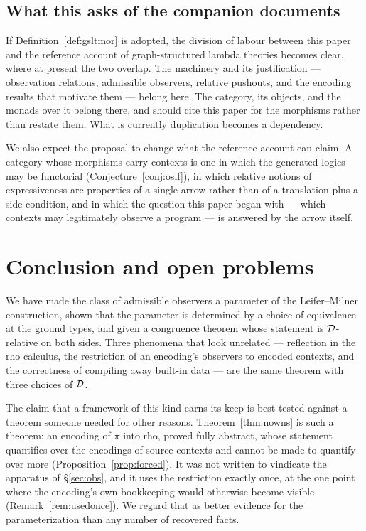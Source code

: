 \documentclass{article}
\begin{document}
\subsection{What this asks of the companion documents}

If Definition~\ref{def:gsltmor} is adopted, the division of labour between this paper and the reference account of graph-structured lambda theories becomes clear, where at present the two overlap. The machinery and its justification --- observation relations, admissible observers, relative pushouts, and the encoding results that motivate them --- belong here. The category, its objects, and the monads over it belong there, and should cite this paper for the morphisms rather than restate them. What is currently duplication becomes a dependency.

We also expect the proposal to change what the reference account can claim. A category whose morphisms carry contexts is one in which the generated logics may be functorial (Conjecture~\ref{conj:oslf}), in which relative notions of expressiveness are properties of a single arrow rather than of a translation plus a side condition, and in which the question this paper began with --- which contexts may legitimately observe a program --- is answered by the arrow itself.

\section{Conclusion and open problems}

We have made the class of admissible observers a parameter of the Leifer--Milner construction, shown that the parameter is determined by a choice of equivalence at the ground types, and given a congruence theorem whose statement is $\mathcal{D}$-relative on both sides. Three phenomena that look unrelated --- reflection in the rho calculus, the restriction of an encoding's observers to encoded contexts, and the correctness of compiling away built-in data --- are the same theorem with three choices of $\mathcal{D}$.

The claim that a framework of this kind earns its keep is best tested against a theorem someone needed for other reasons. Theorem~\ref{thm:nowns} is such a theorem: an encoding of $\pi$ into rho, proved fully abstract, whose statement quantifies over the encodings of source contexts and cannot be made to quantify over more (Proposition~\ref{prop:forced}). It was not written to vindicate the apparatus of \S\ref{sec:obs}, and it uses the restriction exactly once, at the one point where the encoding's own bookkeeping would otherwise become visible (Remark~\ref{rem:usedonce}). We regard that as better evidence for the parameterization than any number of recovered facts.
\end{document}
